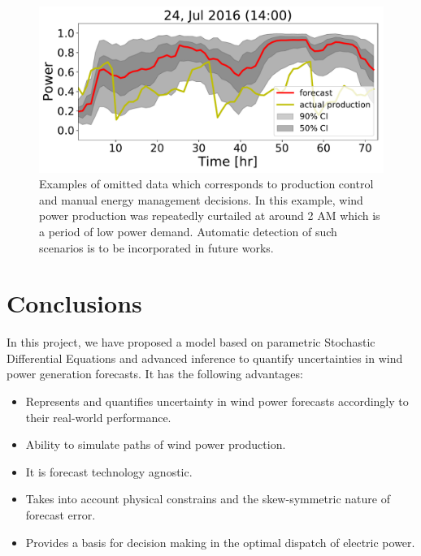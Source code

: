 \documentclass[ima, 20pt, portrait, plainboxedsections]{sciposter}
\begin{document}
\begin{multicols}{3}
 \begin{figure}[t]
\begin{center}
   \includegraphics[width=0.8\linewidth]{72hr_forecast_CI_623.pdf}  %
\end{center}
   \caption{ Examples of omitted data which corresponds to production control and manual energy management decisions. In this example,  wind power production was repeatedly curtailed at around 2 AM which is a period of low power demand. Automatic detection of such scenarios is to be incorporated in future works.}
\label{fig:6hr}
\end{figure}

\section*{Conclusions}
In this project, we have proposed a model based on parametric Stochastic Differential Equations and advanced inference to quantify uncertainties in wind power generation forecasts. It has the following advantages:
\begin{itemize}
\item  Represents and quantifies uncertainty in wind power forecasts accordingly to their real-world performance.
\item Ability to simulate paths of wind power production.
\item It is forecast technology agnostic.
\item  Takes into account physical constrains and the skew-symmetric nature of forecast error.
\item Provides a basis for decision making in the optimal dispatch of electric power.
\end{itemize}



\end{multicols}
\end{document}
